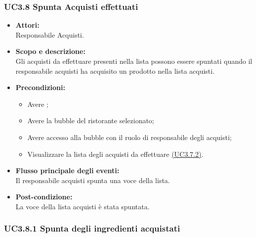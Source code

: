\subsubsection{UC3.8 Spunta Acquisti effettuati} \label{UC3.8}

\begin{itemize}
	\item \textbf{Attori:}
	\\Responsabile Acquisti.
	\item \textbf{Scopo e descrizione:} 
	\\Gli acquisti da effettuare presenti nella lista possono essere spuntati quando il responsabile acquisti ha acquisito un prodotto nella lista acquisti.
	\item \textbf{Precondizioni:}
	\begin{itemize}
		\item Avere ;
		\item Avere la bubble del ristorante selezionato;
		\item Avere accesso alla bubble con il ruolo di responsabile degli acquisti;
		\item Visualizzare la lista degli acquisti da effettuare \hyperref[UC3.7.2]{(UC3.7.2)}.
	\end{itemize}
	\item \textbf{Flusso principale degli eventi:}
	\\Il responsabile acquisti spunta una voce della lista.
	\item \textbf{Post-condizione:}
	\\La voce della lista acquisti è stata spuntata.
\end{itemize}

\subsubsection{UC3.8.1 Spunta degli ingredienti acquistati} \label{UC3.8.1}


